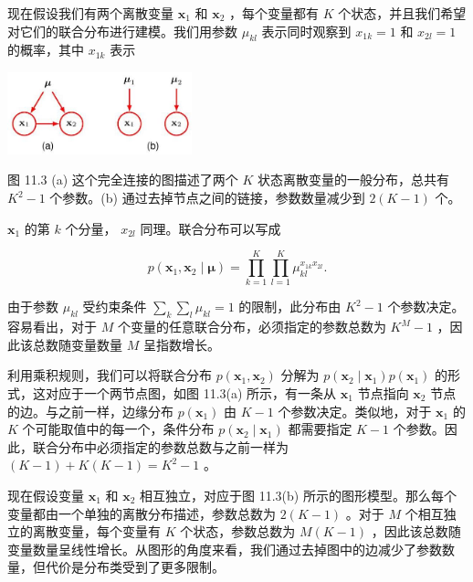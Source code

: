 \documentclass[10pt]{article}
\begin{document}
现在假设我们有两个离散变量 \({\mathbf{x}}_{1}\) 和 \({\mathbf{x}}_{2}\) ，每个变量都有 \(K\) 个状态，并且我们希望对它们的联合分布进行建模。我们用参数 \({\mu }_{kl}\) 表示同时观察到 \({x}_{1k} = 1\) 和 \({x}_{2l} = 1\) 的概率，其中 \({x}_{1k}\) 表示

\begin{center}
\includegraphics[max width=0.4\textwidth]{images/0194e279-9b28-703a-88f4-c3ac21e2010d_349_919_353_509_227_0.jpg}
\end{center}
\hspace*{3em} 

图 11.3 (a) 这个完全连接的图描述了两个 \(K\) 状态离散变量的一般分布，总共有 \({K}^{2} - 1\) 个参数。(b) 通过去掉节点之间的链接，参数数量减少到 \(2\left( {K - 1}\right)\) 个。

\({\mathbf{x}}_{1}\) 的第 \(k\) 个分量， \({x}_{2l}\) 同理。联合分布可以写成

\[
p\left( {{\mathbf{x}}_{1},{\mathbf{x}}_{2} \mid  \mathbf{\mu }}\right)  = \mathop{\prod }\limits_{{k = 1}}^{K}\mathop{\prod }\limits_{{l = 1}}^{K}{\mu }_{kl}^{{x}_{1k}{x}_{2l}}.
\]

由于参数 \({\mu }_{kl}\) 受约束条件 \(\mathop{\sum }\limits_{k}\mathop{\sum }\limits_{l}{\mu }_{kl} = 1\) 的限制，此分布由 \({K}^{2} - 1\) 个参数决定。容易看出，对于 \(M\) 个变量的任意联合分布，必须指定的参数总数为 \({K}^{M} - 1\) ，因此该总数随变量数量 \(M\) 呈指数增长。

利用乘积规则，我们可以将联合分布 \(p\left( {{\mathbf{x}}_{1},{\mathbf{x}}_{2}}\right)\) 分解为 \(p\left( {{\mathbf{x}}_{2} \mid  {\mathbf{x}}_{1}}\right) p\left( {\mathbf{x}}_{1}\right)\) 的形式，这对应于一个两节点图，如图 11.3(a) 所示，有一条从 \({\mathbf{x}}_{1}\) 节点指向 \({\mathbf{x}}_{2}\) 节点的边。与之前一样，边缘分布 \(p\left( {\mathbf{x}}_{1}\right)\) 由 \(K - 1\) 个参数决定。类似地，对于 \({\mathbf{x}}_{1}\) 的 \(K\) 个可能取值中的每一个，条件分布 \(p\left( {{\mathbf{x}}_{2} \mid  {\mathbf{x}}_{1}}\right)\) 都需要指定 \(K - 1\) 个参数。因此，联合分布中必须指定的参数总数与之前一样为 \(\left( {K - 1}\right)  + K\left( {K - 1}\right)  = {K}^{2} - 1\) 。

现在假设变量 \({\mathbf{x}}_{1}\) 和 \({\mathbf{x}}_{2}\) 相互独立，对应于图 11.3(b) 所示的图形模型。那么每个变量都由一个单独的离散分布描述，参数总数为 \(2\left( {K - 1}\right)\) 。对于 \(M\) 个相互独立的离散变量，每个变量有 \(K\) 个状态，参数总数为 \(M\left( {K - 1}\right)\) ，因此该总数随变量数量呈线性增长。从图形的角度来看，我们通过去掉图中的边减少了参数数量，但代价是分布类受到了更多限制。
\end{document}
